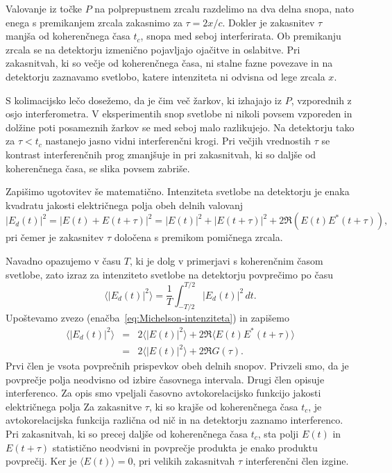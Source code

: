 Valovanje iz točke $P$ na polprepustnem zrcalu razdelimo na dva delna snopa, 
nato enega s premikanjem zrcala zakasnimo za $\tau=2x/c$. Dokler je zakasnitev
$\tau$ manjša od koherenčnega časa $t_{c}$, snopa med seboj interferirata.
Ob premikanju zrcala se na detektorju izmenično pojavljajo ojačitve in 
oslabitve. Pri zakasnitvah, ki so večje od koherenčnega časa, ni stalne fazne 
povezave in na detektorju zaznavamo svetlobo, katere intenziteta ni odvisna od lege
zrcala $x$.

\begin{remark}
S kolimacijsko lečo dosežemo, da je čim več žarkov, ki izhajajo iz
$P$, vzporednih z osjo interferometra. V eksperimentih snop svetlobe 
ni nikoli povsem vzporeden in dolžine poti posameznih žarkov se med
seboj malo razlikujejo. Na detektorju tako za $\tau < t_c$ nastanejo jasno 
vidni interferenčni krogi. Pri večjih vrednostih $\tau$  se kontrast interferenčnih
prog zmanjšuje in pri zakasnitvah, ki so daljše od koherenčnega časa, se 
slika povsem zabriše. 
\end{remark}

Zapišimo ugotovitev še matematično.
Intenziteta svetlobe na detektorju je enaka kvadratu jakosti električnega
polja obeh delnih valovanj
\begin{equation}
|E_{d}(t)|^{2}=|E(t)+E(t+\tau)|^{2}=|E(t)|^{2}+|E(t+\tau)|^{2}+2\Re \left(E(t)E^{*}(t+\tau)\right)\!\!,
\label{eq:Michelson-intenziteta}
\end{equation}
pri čemer je zakasnitev $\tau$ določena s premikom pomičnega zrcala.

Navadno opazujemo v času $T$, ki je dolg v primerjavi s koherenčnim
časom svetlobe, zato izraz za intenziteto svetlobe na detektorju povprečimo po času
\begin{equation}
\langle|E_{d}(t)|^{2}\rangle = \frac{1}{T}\int_{-T/2}^{T/2}|E{}_{d}(t)|^{2}\, dt.
\end{equation}
Upoštevamo zvezo (enačba~\ref{eq:Michelson-intenziteta}) in zapišemo
\begin{eqnarray}
\langle|E_{d}(t)|^{2}\rangle & = & 2\langle|E(t)|^{2}\rangle+2\Re\langle E(t)E^{*}(t+\tau)\rangle \nonumber \\ 
&=& 2\langle|E(t)|^{2}\rangle+2\Re G(\tau).
 \label{eq:caskohav}
\end{eqnarray}
Prvi člen je vsota povprečnih prispevkov obeh delnih snopov. Privzeli smo, 
da je povprečje polja neodvisno od izbire časovnega intervala.
Drugi člen opisuje interferenco. 
Za opis smo vpeljali
časovno avtokorelacijsko funkcijo
jakosti električnega polja 
Za zakasnitve $\tau$, ki so krajše od koherenčnega časa $t_c$, je avtokorelacijska
funkcija različna od nič in na
detektorju zaznamo interferenco. Pri zakasnitvah, ki so precej
daljše od koherenčnega časa $t_{c}$, sta polji $E(t)$ in $E(t+\tau)$
statistično neodvisni in povprečje produkta je enako produktu povprečij.
Ker je $\langle E(t)\rangle=0$, pri velikih zakasnitvah $\tau$ interferenčni
člen izgine.

